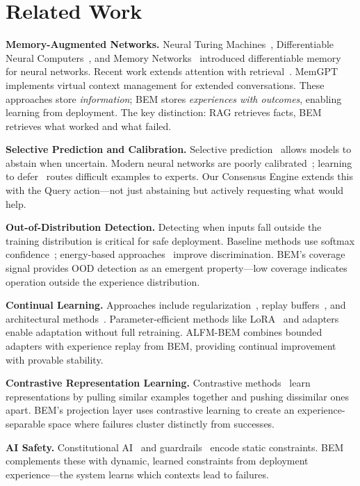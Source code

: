 \documentclass[twoside,11pt]{article}
\begin{document}
\section{Related Work}
\label{sec:related}

\textbf{Memory-Augmented Networks.} Neural Turing Machines~\cite{Graves2014}, Differentiable Neural Computers~\cite{Graves2016}, and Memory Networks~\cite{Weston2015} introduced differentiable memory for neural networks. Recent work extends attention with retrieval~\cite{Wu2022,Borgeaud2022}. MemGPT~\cite{Packer2023} implements virtual context management for extended conversations. These approaches store \emph{information}; BEM stores \emph{experiences with outcomes}, enabling learning from deployment. The key distinction: RAG retrieves facts, BEM retrieves what worked and what failed.

\textbf{Selective Prediction and Calibration.} Selective prediction~\cite{Chow1970,ElYaniv2010,Geifman2017} allows models to abstain when uncertain. Modern neural networks are poorly calibrated~\cite{Guo2017}; learning to defer~\cite{Madras2018} routes difficult examples to experts. Our Consensus Engine extends this with the Query action---not just abstaining but actively requesting what would help.

\textbf{Out-of-Distribution Detection.} Detecting when inputs fall outside the training distribution is critical for safe deployment. Baseline methods use softmax confidence~\cite{Hendrycks2017}; energy-based approaches~\cite{Liu2020} improve discrimination. BEM's coverage signal provides OOD detection as an emergent property---low coverage indicates operation outside the experience distribution.

\textbf{Continual Learning.} Approaches include regularization~\cite{Kirkpatrick2017}, replay buffers~\cite{Rolnick2019}, and architectural methods~\cite{Rusu2016}. Parameter-efficient methods like LoRA~\cite{Hu2022} and adapters~\cite{Houlsby2019} enable adaptation without full retraining. ALFM-BEM combines bounded adapters with experience replay from BEM, providing continual improvement with provable stability.

\textbf{Contrastive Representation Learning.} Contrastive methods~\cite{Chen2020,Radford2021} learn representations by pulling similar examples together and pushing dissimilar ones apart. BEM's projection layer uses contrastive learning to create an experience-separable space where failures cluster distinctly from successes.

\textbf{AI Safety.} Constitutional AI~\cite{Bai2022} and guardrails~\cite{Rebedea2023} encode static constraints. BEM complements these with dynamic, learned constraints from deployment experience---the system learns which contexts lead to failures.
\end{document}
